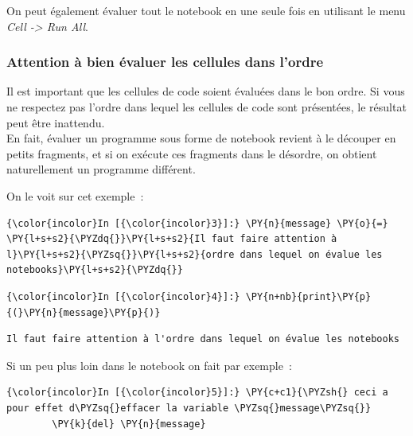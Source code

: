     On peut également évaluer tout le notebook en une seule fois en
utilisant le menu \emph{Cell -\textgreater{} Run All}.

    \hypertarget{attention-uxe0-bien-uxe9valuer-les-cellules-dans-lordre}{%
\subsubsection{Attention à bien évaluer les cellules dans
l'ordre}\label{attention-uxe0-bien-uxe9valuer-les-cellules-dans-lordre}}

    Il est important que les cellules de code soient évaluées dans le bon
ordre. Si vous ne respectez pas l'ordre dans lequel les cellules de code
sont présentées, le résultat peut être inattendu.\\

En fait, évaluer un programme sous forme de notebook revient à le
découper en petits fragments, et si on exécute ces fragments dans le
désordre, on obtient naturellement un programme différent.

    On le voit sur cet exemple~:

    \begin{Verbatim}[commandchars=\\\{\}]
{\color{incolor}In [{\color{incolor}3}]:} \PY{n}{message} \PY{o}{=} \PY{l+s+s2}{\PYZdq{}}\PY{l+s+s2}{Il faut faire attention à l}\PY{l+s+s2}{\PYZsq{}}\PY{l+s+s2}{ordre dans lequel on évalue les notebooks}\PY{l+s+s2}{\PYZdq{}}
\end{Verbatim}


    \begin{Verbatim}[commandchars=\\\{\}]
{\color{incolor}In [{\color{incolor}4}]:} \PY{n+nb}{print}\PY{p}{(}\PY{n}{message}\PY{p}{)}
\end{Verbatim}


    \begin{Verbatim}[commandchars=\\\{\}]
Il faut faire attention à l'ordre dans lequel on évalue les notebooks

    \end{Verbatim}

    Si un peu plus loin dans le notebook on fait par exemple~:

    \begin{Verbatim}[commandchars=\\\{\}]
{\color{incolor}In [{\color{incolor}5}]:} \PY{c+c1}{\PYZsh{} ceci a pour effet d\PYZsq{}effacer la variable \PYZsq{}message\PYZsq{}}
        \PY{k}{del} \PY{n}{message}
\end{Verbatim}


